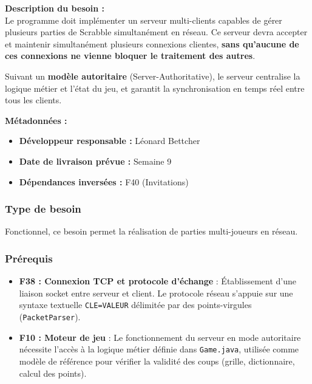 \documentclass[a4paper]{article}
\begin{document}
\begin{besoinbox}
    \textbf{\large Description du besoin :} \\
    
    Le programme doit implémenter un serveur multi-clients capables de gérer plusieurs parties de Scrabble simultanément en réseau. Ce serveur devra accepter et maintenir simultanément plusieurs connexions clientes, \textbf{sans qu'aucune de ces connexions ne vienne bloquer le traitement des autres}. 
    
    Suivant un \textbf{modèle autoritaire} (Server-Authoritative), le serveur centralise la logique métier et l'état du jeu, et garantit la synchronisation en temps réel entre tous les clients.
    
    \vspace{3mm}
    \textbf{Métadonnées :}
    \begin{itemize}
        \item \textbf{Développeur responsable :} Léonard Bettcher
        \item \textbf{Date de livraison prévue :} Semaine 9
        \item \textbf{Dépendances inversées :} F40 (Invitations)
    \end{itemize}
\end{besoinbox}

\subsubsection{Type de besoin}
Fonctionnel, ce besoin permet la réalisation de parties multi-joueurs en réseau.

\subsubsection{Prérequis}
\begin{itemize}
    \item \textbf{F38 : Connexion TCP et protocole d'échange} : Établissement d'une liaison socket entre serveur et client. Le protocole réseau s'appuie sur une syntaxe textuelle \texttt{CLE=VALEUR} délimitée par des points-virgules (\texttt{PacketParser}).
    \item \textbf{F10 : Moteur de jeu} : Le fonctionnement du serveur en mode autoritaire nécessite l'accès à la logique métier définie dans \texttt{Game.java}, utilisée comme modèle de référence pour vérifier la validité des coups (grille, dictionnaire, calcul des points).
\end{itemize}
\end{document}
